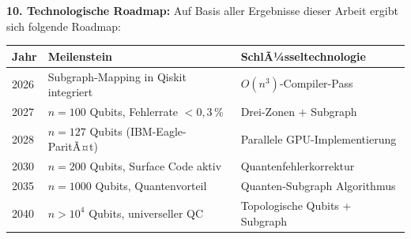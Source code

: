 ﻿\documentclass[a4paper,12pt]{article}
\theoremstyle{definition}
\begin{document}
\textbf{10. Technologische Roadmap:}
Auf Basis aller Ergebnisse dieser Arbeit ergibt sich folgende Roadmap:
\begin{center}
\begin{tabular}{@{}lll@{}}
\toprule
\textbf{Jahr} & \textbf{Meilenstein} & \textbf{SchlÃ¼sseltechnologie} \\
\midrule
2026 & Subgraph-Mapping in Qiskit integriert & $O(n^3)$-Compiler-Pass \\
2027 & $n = 100$ Qubits, Fehlerrate $< 0{,}3\,\%$ & Drei-Zonen $+$ Subgraph \\
2028 & $n = 127$ Qubits (IBM-Eagle-ParitÃ¤t) & Parallele GPU-Implementierung \\
2030 & $n = 200$ Qubits, Surface Code aktiv & Quantenfehlerkorrektur \\
2035 & $n = 1000$ Qubits, Quantenvorteil & Quanten-Subgraph Algorithmus \\
2040 & $n > 10^4$ Qubits, universeller QC & Topologische Qubits + Subgraph \\
\bottomrule
\end{tabular}
\end{center}
\end{document}
